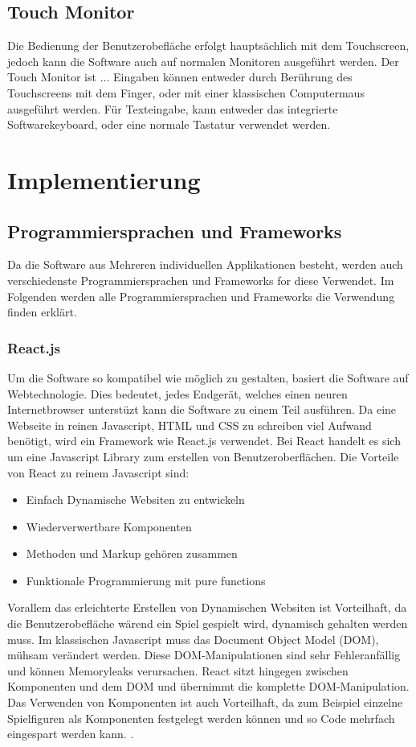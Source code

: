 \documentclass[12pt,a4paper,bibliography=totocnumbered,listof=totocnumbered]{article}
\begin{document}
\subsection{Touch Monitor}
Die Bedienung der Benutzerobefläche erfolgt hauptsächlich mit dem Touchscreen, jedoch kann die Software auch auf normalen Monitoren ausgeführt werden.
Der Touch Monitor ist ...%
Eingaben können entweder durch Berührung des Touchscreens mit dem Finger, oder mit einer klassischen Computermaus ausgeführt werden.
Für Texteingabe, kann entweder das integrierte Softwarekeyboard, oder eine normale Tastatur verwendet werden.



\pagebreak
\section{Implementierung}

\subsection{Programmiersprachen und Frameworks}
Da die Software aus Mehreren individuellen Applikationen besteht, werden auch verschiedenste Programmiersprachen und Frameworks for diese Verwendet.
Im Folgenden werden alle Programmiersprachen und Frameworks die Verwendung finden erklärt.

\subsubsection{React.js}
Um die Software so kompatibel wie möglich zu gestalten, basiert die Software auf Webtechnologie. Dies bedeutet, jedes Endgerät, welches einen neuren 
Internetbrowser unterstüzt kann die Software zu einem Teil ausführen. Da eine Webseite in reinen Javascript, HTML und CSS zu schreiben viel Aufwand benötigt, 
wird ein Framework wie React.js verwendet. Bei React handelt es sich um eine Javascript Library zum erstellen von Benutzeroberflächen.
Die Vorteile von React zu reinem Javascript sind:
\begin{itemize}
    \item Einfach Dynamische Websiten zu entwickeln
    \item Wiederverwertbare Komponenten
    \item Methoden und Markup gehören zusammen
    \item Funktionale Programmierung mit pure functions
\end{itemize}
Vorallem das erleichterte Erstellen von Dynamischen Websiten ist Vorteilhaft, da die Benutzerobefläche wärend ein Spiel gespielt wird, dynamisch gehalten werden muss.
Im klassischen Javascript muss das Document Object Model (DOM), mühsam verändert werden. Diese DOM-Manipulationen sind sehr Fehleranfällig und können Memoryleaks
verursachen. React sitzt hingegen zwischen Komponenten und dem DOM und übernimmt die komplette DOM-Manipulation.
Das Verwenden von Komponenten ist auch Vorteilhaft, da zum Beispiel einzelne Spielfiguren als Komponenten festgelegt werden können 
und so Code mehrfach eingespart werden kann. \cite{React.js}.
\end{document}
